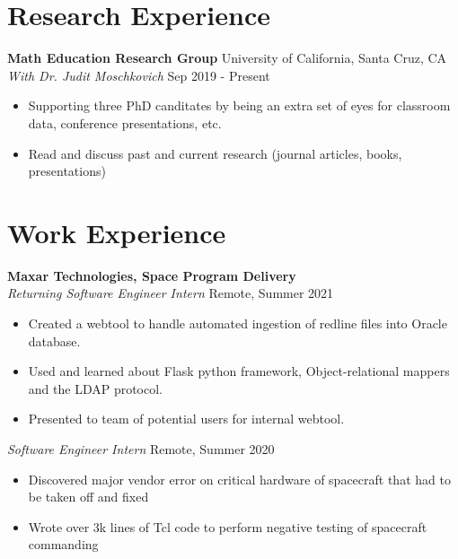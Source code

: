 \documentclass[10pt,letterpaper]{article}
\begin{document}
\section*{Research Experience} \hrulefill

\textbf{Math Education Research Group} \hfill University of California, Santa Cruz, CA\\
\textit{With Dr. Judit Moschkovich} \hfill Sep 2019 - Present
\begin{itemize}
    \item Supporting three PhD canditates by being an extra set of eyes for classroom data, conference presentations, etc.
    \item Read and discuss past and current research (journal articles, books, presentations)
\end{itemize}


\section*{Work Experience} \hrulefill 

\textbf{Maxar Technologies, Space Program Delivery}\\
\textit{Returning Software Engineer Intern} \hfill Remote, Summer 2021
\begin{itemize}
    \item Created a webtool to handle automated ingestion of redline files into Oracle database.
    \item Used and learned about Flask python framework, Object-relational mappers and the LDAP protocol.
    \item Presented to team of potential users for internal webtool.
\end{itemize}
\textit{Software Engineer Intern} \hfill Remote, Summer 2020
\begin{itemize}
    \item Discovered major vendor error on critical hardware of spacecraft that had to be taken off and fixed
    \item Wrote over 3k lines of Tcl code to perform negative testing of spacecraft commanding
\end{itemize}
%
%
\end{document}
